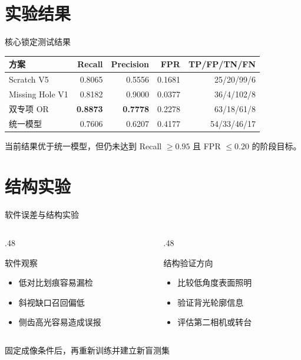 \documentclass[aspectratio=169,10pt]{beamer}
\begin{document}
\section{实验结果}

\begin{frame}{核心锁定测试结果}
  \centering
  \renewcommand{\arraystretch}{1.25}
  \begin{tabular}{lrrrr}
    \toprule
    方案 & Recall & Precision & FPR & TP/FP/TN/FN \\
    \midrule
    Scratch V5 & 0.8065 & 0.5556 & 0.1681 & 25/20/99/6 \\
    Missing Hole V1 & 0.8182 & 0.9000 & 0.0377 & 36/4/102/8 \\
    \rowcolor{seuyellowlight}
    双专项 OR & \textbf{0.8873} & \textbf{0.7778} & 0.2278 & 63/18/61/8 \\
    统一模型 & 0.7606 & 0.6207 & 0.4177 & 54/33/46/17 \\
    \bottomrule
  \end{tabular}

  \vfill
  {\small 当前结果优于统一模型，但仍未达到 Recall $\geq 0.95$ 且 FPR $\leq 0.20$ 的阶段目标。}
\end{frame}

\section{结构实验}

\begin{frame}{软件误差与结构实验}
  \begin{columns}[T,onlytextwidth]
    \begin{column}{.48\textwidth}
      \begin{block}{软件观察}
        \begin{itemize}
          \item 低对比划痕容易漏检
          \item 斜视缺口召回偏低
          \item 侧齿高光容易造成误报
        \end{itemize}
      \end{block}
    \end{column}
    \begin{column}{.48\textwidth}
      \begin{alertblock}{结构验证方向}
        \begin{itemize}
          \item 比较低角度表面照明
          \item 验证背光轮廓信息
          \item 评估第二相机或转台
        \end{itemize}
      \end{alertblock}
    \end{column}
  \end{columns}

  \vfill
  \centering
  \textcolor{seugreen}{\large 固定成像条件后，再重新训练并建立新盲测集}
\end{frame}
\end{document}
